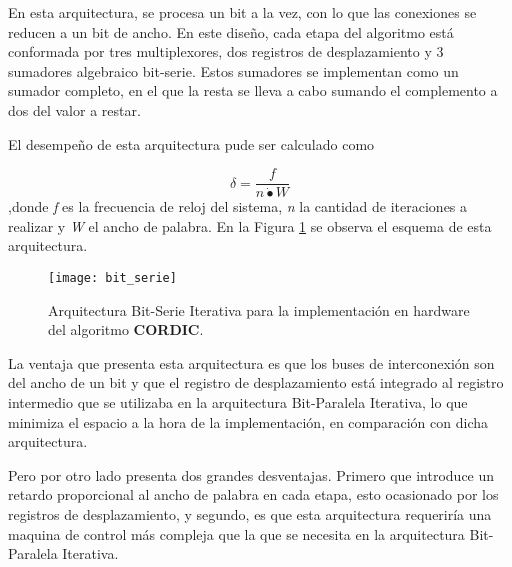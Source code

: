 En esta arquitectura, se procesa un bit a la vez, con lo que las conexiones se reducen a un bit de ancho. En este diseño, cada etapa del algoritmo está conformada por tres multiplexores, dos registros de desplazamiento y 3 sumadores algebraico bit-serie. Estos sumadores se implementan como un sumador completo, en el que la resta se lleva a cabo sumando el complemento a dos del valor a restar.

El desempeño de esta arquitectura pude ser calculado como

\begin{equation}\label{eq:desem-serie}
\delta = \dfrac{f}{n \dot{•} W}
\end{equation}
,donde \textit{f} es la frecuencia de reloj del sistema, \textit{n} la cantidad de iteraciones a realizar y \textit{W} el ancho de palabra. En la Figura \ref{fig:bit_serie} se observa el esquema de esta arquitectura.

\begin{figure}[htb]
  \centering
  \texttt{[image: bit\_serie]}
  \caption{Arquitectura Bit-Serie Iterativa para la implementación en hardware del algoritmo \textbf{CORDIC}.}
  \label{fig:bit_serie}
\end{figure}

La ventaja que presenta esta arquitectura es que los buses de interconexión son del ancho de un bit y que el registro de desplazamiento está integrado al registro intermedio que se utilizaba en la arquitectura Bit-Paralela Iterativa, lo que minimiza el espacio a la hora de la implementación, en comparación con dicha arquitectura. 

Pero por otro lado presenta dos grandes desventajas. Primero que introduce un retardo proporcional al ancho de palabra en cada etapa, esto ocasionado por los registros de desplazamiento, y segundo, es que esta arquitectura requeriría una maquina de control más compleja que la que se necesita en la arquitectura Bit-Paralela Iterativa.











